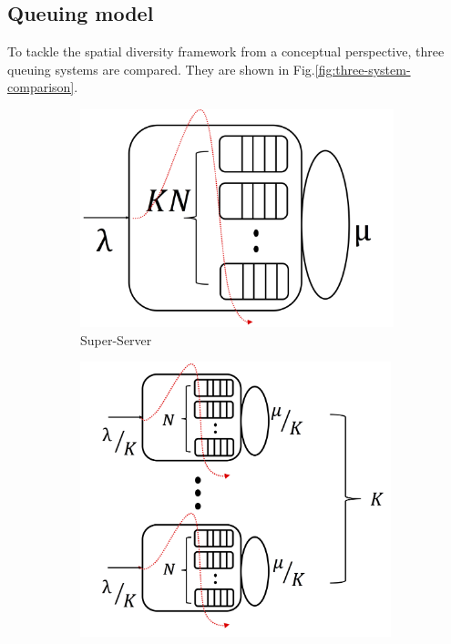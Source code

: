 \subsection{Queuing model}
\label{sec:threesystemcomparison}
To tackle the spatial diversity framework from a conceptual perspective, three queuing systems are compared. They are shown in Fig.\ref{fig:three-system-comparison}. 
\begin{figure}
	\centering
	\begin{subfigure}[b]{0.3\textwidth}
		\centering
		\includegraphics[width=\textwidth]{ChapterSpatialDiversityFramework/Figures/switchone}
		\smallskip
		\caption{Super-Server}
		\label{fig:switchone}
	\end{subfigure}
	\hfill
	\begin{subfigure}[b]{0.3\textwidth}
		\centering
		\includegraphics[width=0.99\textwidth]{ChapterSpatialDiversityFramework/Figures/esn}

\end{subfigure}
\end{figure}
